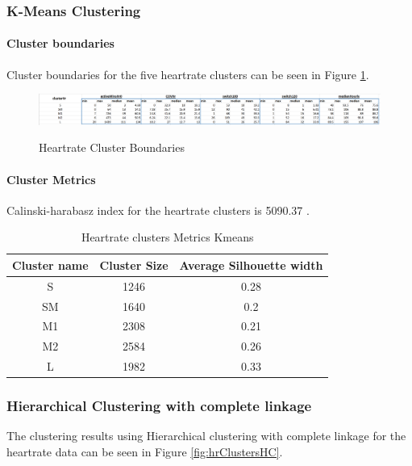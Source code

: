 \documentclass{article}
\begin{document}
\subsubsection{K-Means Clustering}
\paragraph{Cluster boundaries}
Cluster boundaries for the five heartrate clusters can be seen in Figure \ref{fig:hrBoundaries}.

\begin{figure}[H]
  \centering
  \caption{Heartrate Cluster Boundaries}
  \includegraphics[scale=0.5]{hr_cluster_boundaries.png}
  \label{fig:hrBoundaries}
\end{figure}

\paragraph{Cluster Metrics}
Calinski-harabasz index for the heartrate clusters is 5090.37 .

\begin{table}[H]
  \caption{Heartrate clusters Metrics Kmeans}
  \label{hr_metrics}
  \centering
  \begin{tabular}{ |c|c|c|}
    \toprule
    \cmidrule(r){1-2}
    Cluster name & Cluster Size & Average Silhouette width \\
    \hline
    S & 1246 & 0.28 \\
    SM & 1640 & 0.2 \\
    M1 & 2308 & 0.21 \\
    M2 & 2584 & 0.26 \\
    L & 1982 & 0.33 \\
    \bottomrule
    \end{tabular}
\end{table}

\subsubsection{Hierarchical Clustering with complete linkage}

The clustering results using Hierarchical clustering with complete linkage for the heartrate data can be seen in Figure \ref{fig:hrClustersHC}.
\end{document}
